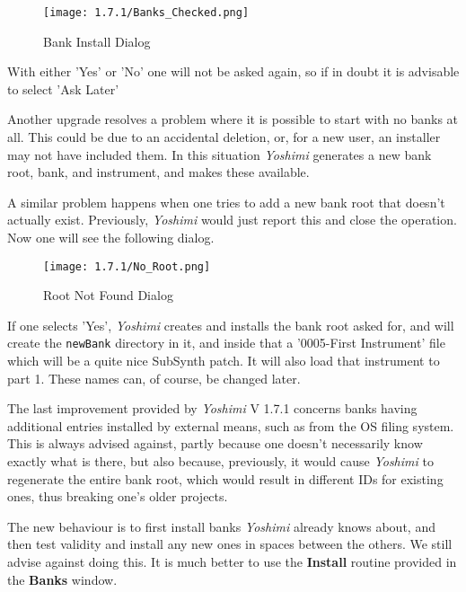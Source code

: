 \begin{figure}[H]
   \centering
   \texttt{[image: 1.7.1/Banks\_Checked.png]}
   \caption{Bank Install Dialog}
   \label{fig:bank_install_dialog}
\end{figure}

   With either 'Yes' or 'No' one will not be asked again, so if in doubt it is
   advisable to select 'Ask Later'

   Another upgrade resolves a problem where it is possible to start with no banks
   at all. This could be due to an accidental deletion, or, for a new user, an
   installer may not have included them. In this situation
   \textsl{Yoshimi} generates a new bank root, bank, and instrument,
   and makes these available.

   A similar problem happens when one tries to add a new bank root that doesn't
   actually exist. Previously, \textsl{Yoshimi} would just report this and close
   the operation. Now one will see the following dialog.

\begin{figure}[H]
   \centering
   \texttt{[image: 1.7.1/No\_Root.png]}
   \caption{Root Not Found Dialog}
   \label{fig:no_root_dialog}
\end{figure}

   If one selects 'Yes', \textsl{Yoshimi} creates and installs the bank root
   asked for, and will create the \texttt{newBank} directory
   in it, and inside that a '0005-First Instrument' file which will be a quite
   nice SubSynth patch. It will also load that instrument to part 1.
   These names can, of course, be changed later.

   The last improvement provided by \textsl{Yoshimi} V 1.7.1 concerns banks
   having additional entries installed by external means, such as from the OS
   filing system. This is always advised against, partly because one doesn't
   necessarily know exactly what is there, but also because, previously, it would
   cause \textsl{Yoshimi} to regenerate the entire bank root,
   which would result in different IDs for existing ones, thus breaking one's
   older projects.

   The new behaviour is to first install banks \textsl{Yoshimi} already knows
   about, and then test validity and install any new ones in spaces between the
   others. We still advise against doing this. It is much better to use the
   \textbf{Install} routine provided in the \textbf{Banks} window.

